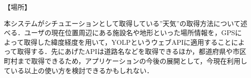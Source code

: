 【場所】
\par
本システムがシチュエーションとして取得している”天気”の取得方法について述べる．ユーザの現在位置周辺にある施設名や地形といった場所情報を，GPSによって取得した緯度経度を用いて，YOLPというウェブAPIに適用することによって取得する．先にあげたAPIは道路名などを取得できるほか，都道府県や市区町村まで取得できるため，アプリケーションの今後の展開として，今現在利用している以上の使い方を検討できるかもしれない．
